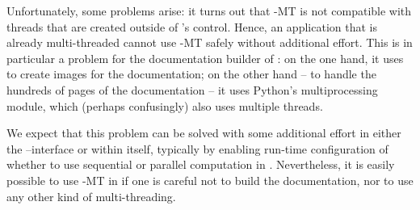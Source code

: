\documentclass{deliverablereport}
\begin{document}
Unfortunately, some problems arise:
it turns out that \Pari-MT is not compatible with
threads that are created outside of \Pari's control.
Hence, an application that is already multi-threaded cannot use
\Pari-MT safely without additional effort.
This is in particular a problem for the documentation builder of \Sage:
on the one hand, it uses \Pari to create images for the documentation;
on the other hand -- to handle the hundreds of pages of the documentation -- it uses Python's
multiprocessing module,
which (perhaps confusingly) also uses multiple threads.

We expect that this problem can be solved with some additional effort
in either the \Sage--\Pari interface or within \Pari itself,
typically by enabling run-time configuration of whether to use
sequential or parallel computation in \Pari.
Nevertheless, it is easily possible to use \Pari-MT in \Sage
if one is careful not to build the documentation,
nor to use any other kind of multi-threading.



\end{document}
